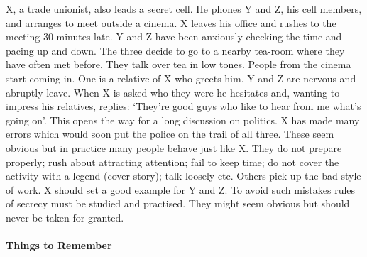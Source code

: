 X, a trade unionist, also leads a secret cell. He phones Y and Z, his
cell members, and arranges to meet outside a cinema. X leaves his office
and rushes to the meeting 30 minutes late. Y and Z have been anxiously
checking the time and pacing up and down. The three decide to go to a
nearby tea-room where they have often met before. They talk over tea in
low tones. People from the cinema start coming in. One is a relative of
X who greets him. Y and Z are nervous and abruptly leave. When X is
asked who they were he hesitates and, wanting to impress his relatives,
replies: `They're good guys who like to hear from me what's going on'.
This opens the way for a long discussion on politics. X has made many
errors which would soon put the police on the trail of all three. These
seem obvious but in practice many people behave just like X. They do not
prepare properly; rush about attracting attention; fail to keep time; do
not cover the activity with a legend (cover story); talk loosely etc.
Others pick up the bad style of work. X should set a good example for Y
and Z. To avoid such mistakes rules of secrecy must be studied and
practised. They might seem obvious but should never be taken for
granted.

\paragraph{Things to Remember}

